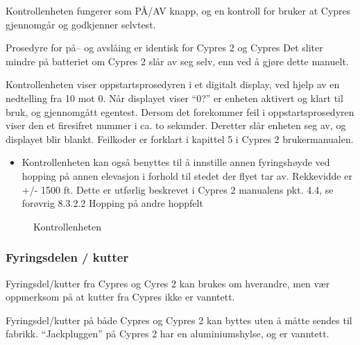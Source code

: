 Kontrollenheten fungerer som PÅ/AV knapp, og en kontroll for bruker at Cypres gjennomgår og godkjenner selvtest.

Prosedyre for på– og avslåing er identisk for Cypres 2 og Cypres Det sliter mindre på batteriet om Cypres 2 slår av seg selv, enn ved å gjøre dette manuelt.

Kontrollenheten viser oppstartsprosedyren i et digitalt display, ved hjelp av en nedtelling fra 10 mot 0. Når displayet viser ``0?'' er enheten aktivert og klart til bruk, og gjennomgått egentest. Dersom det forekommer feil i oppstartsprosedyren viser den et firesifret nummer i ca. to sekunder. Deretter slår enheten seg av, og displayet blir blankt. Feilkoder er forklart i kapittel 5 i Cypres 2 brukermanualen.

\begin{itemize}
\item Kontrollenheten kan også benyttes til å innstille annen fyringshøyde ved hopping på annen elevasjon i forhold til stedet der flyet tar av. Rekkevidde er +/- 1500 ft. Dette er utførlig beskrevet i Cypres 2 manualens pkt. 4.4, se forøvrig 8.3.2.2 Hopping på andre hoppfelt
\end{itemize}

\begin{figure}
	\caption{Kontrollenheten}
\end{figure}

\subsubsection{Fyringsdelen / kutter}
Fyringsdel/kutter fra Cypres og Cyres 2 kan brukes om hverandre, men vær oppmerksom på at kutter fra Cypres ikke er vanntett.

Fyringsdel/kutter på både Cypres og Cypres 2 kan byttes uten å måtte sendes til fabrikk. ``Jackpluggen'' på Cypres 2 har en aluminiumshylse, og er vanntett.

